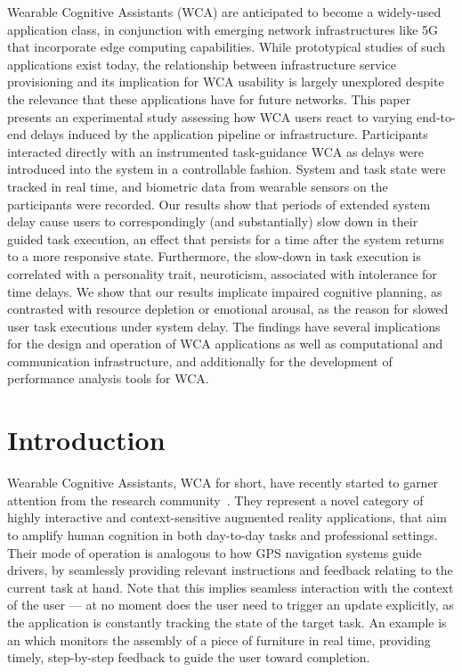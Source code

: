 \documentclass[10pt,letterpaper]{article}
\providecommand{\DIFaddtex}[1]{#1} %
\providecommand{\DIFdeltex}[1]{} %
\providecommand{\DIFaddbegin}{\protect\color{blue}} %
\providecommand{\DIFaddend}{\protect\color{black}} %
\providecommand{\DIFdelbegin}{\protect\color{red}} %
\providecommand{\DIFdelend}{\protect\color{black}} %
\providecommand{\DIFadd}[1]{\texorpdfstring{\DIFaddtex{#1}}{#1}} %
\providecommand{\DIFdel}[1]{\texorpdfstring{\DIFdeltex{#1}}{}} %
\newcommand{\DIFscaledelfig}{0.5}
\newlength{\DIFdelgraphicswidth} %
\newlength{\DIFdelgraphicsheight} %
\newcommand{\DIFaddincludegraphics}[2][]{{\color{blue}\fbox{\DIFOincludegraphics[#1]{#2}}}} %
\newcommand{\DIFdelincludegraphics}[2][]{%
\sbox{\DIFdelgraphicsbox}{\DIFOincludegraphics[#1]{#2}}%
\settoboxwidth{\DIFdelgraphicswidth}{\DIFdelgraphicsbox} %
\settoboxtotalheight{\DIFdelgraphicsheight}{\DIFdelgraphicsbox} %
\scalebox{\DIFscaledelfig}{%
\parbox[b]{\DIFdelgraphicswidth}{\usebox{\DIFdelgraphicsbox}\\[-\baselineskip] \rule{\DIFdelgraphicswidth}{0em}}\llap{\resizebox{\DIFdelgraphicswidth}{\DIFdelgraphicsheight}{%
\setlength{\unitlength}{\DIFdelgraphicswidth}%
\begin{picture}(1,1)%
\thicklines\linethickness{2pt} %
{\color[rgb]{1,0,0}\put(0,0){\framebox(1,1){}}}%
{\color[rgb]{1,0,0}\put(0,0){\line( 1,1){1}}}%
{\color[rgb]{1,0,0}\put(0,1){\line(1,-1){1}}}%
\end{picture}%
}\hspace*{3pt}}} %
} %
\DeclareRobustCommand{\DIFaddbegin}{\DIFOaddbegin \let\includegraphics\DIFaddincludegraphics} %
\DeclareRobustCommand{\DIFaddend}{\DIFOaddend \let\includegraphics\DIFOincludegraphics} %
\DeclareRobustCommand{\DIFdelbegin}{\DIFOdelbegin \let\includegraphics\DIFdelincludegraphics} %
\DeclareRobustCommand{\DIFdelend}{\DIFOaddend \let\includegraphics\DIFOincludegraphics} %
\begin{document}
Wearable Cognitive Assistants (WCA) are anticipated to become a widely-used application class, in conjunction with emerging network infrastructures like 5G that incorporate edge computing capabilities.
While prototypical studies of such applications exist today, the relationship between infrastructure service provisioning and its implication for WCA usability is largely unexplored despite the relevance that these applications have for future networks.
This paper presents an experimental study assessing how WCA users react to varying end-to-end delays induced by the application pipeline or infrastructure.
Participants interacted directly with an instrumented task-guidance WCA as delays were introduced into the system in a controllable fashion.
System and task state were tracked in real time, and biometric data from wearable sensors on the participants were recorded.
Our results show that periods of extended system delay cause users to correspondingly (and substantially) slow down in their guided task execution, an effect that persists for a time after the system returns to a more responsive state.
Furthermore, the slow-down in task execution is correlated with a personality trait, neuroticism, associated with intolerance for time delays.
We show that our results implicate impaired cognitive planning, as contrasted with resource depletion or emotional arousal, as the reason for slowed user task executions under system delay.
The findings have several implications for the design and operation of WCA applications as well as computational and communication infrastructure, and additionally for the development of performance analysis tools for WCA.\@


\linenumbers%
\section{Introduction}

Wearable Cognitive Assistants, \DIFdelbegin \DIFdel{\emph{WCA} }\DIFdelend \DIFaddbegin \DIFadd{WCA }\DIFaddend for short, have recently started to garner attention from the research community~\autocite{Ha:TowardsWearableCogAssist,Chen:EarlyImplementation}.
They represent a novel category of highly interactive and context-sensitive augmented reality applications, that aim to \DIFdelbegin \DIFdel{augment }\DIFdelend \DIFaddbegin \DIFadd{amplify }\DIFaddend human cognition in both day-to-day tasks and professional settings.
Their mode of operation is analogous to how GPS navigation systems guide drivers, by seamlessly providing relevant instructions and feedback relating to the current task at hand.
Note that this implies seamless interaction with the context of the user --- at no moment does the user need to trigger an update explicitly, as the application is constantly tracking the state of the target task.
An example is an \textcite{IKEAAssistant} which monitors the assembly of a piece of furniture in real time, providing timely, step-by-step feedback to guide the user toward completion.
\end{document}
